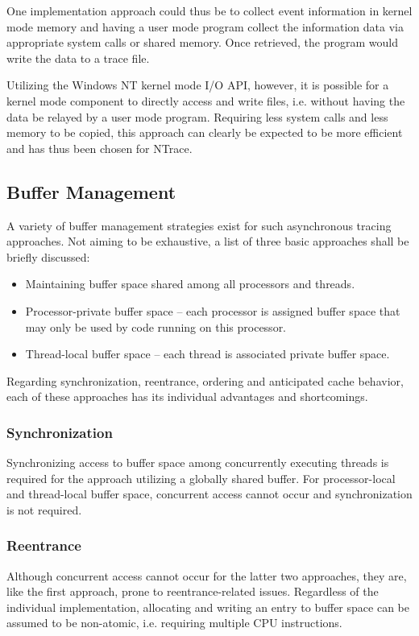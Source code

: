 One implementation approach could thus be to collect event information in kernel 
mode memory and having a user mode program collect the information data via appropriate
system calls or shared memory. Once retrieved, the program would write the data 
to a trace file.

Utilizing the Windows NT kernel mode I/O API, however, it is possible for a kernel
mode component to directly access and write files, i.e. without having the data be 
relayed by a user mode program. Requiring less system calls and less memory to 
be copied, this approach can clearly be expected to be more efficient and has thus
been chosen for NTrace.

\subsection{Buffer Management}

A variety of buffer management strategies exist for such asynchronous tracing 
approaches. Not aiming to be exhaustive, a list of three basic approaches shall
be briefly discussed:
\begin{itemize}
	\item	Maintaining buffer space shared among all processors and threads. 
	\item Processor-private buffer space -- each processor is assigned buffer space
		that may only be used by code running on this processor.
	\item Thread-local buffer space -- each thread is associated private buffer space.
\end{itemize}
Regarding synchronization, reentrance, ordering and anticipated cache 
behavior, each of these approaches has its individual advantages and shortcomings.

\subsubsection{Synchronization}
Synchronizing access to buffer space among concurrently executing threads is 
required for the approach utilizing a globally shared buffer. For 
processor-local and thread-local buffer space, concurrent access cannot occur
and synchronization is not required.

\subsubsection{Reentrance}
Although concurrent access cannot occur for the latter two approaches, they are,
like the first approach, prone to reentrance-related issues. Regardless of
the individual implementation, allocating and writing an entry to buffer space
can be assumed to be non-atomic, i.e. requiring multiple CPU instructions.


